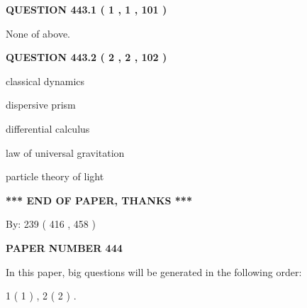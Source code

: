 \documentclass[12pt]{article}
\begin{document}
{\textbf{\Large{QUESTION
443.1 
 ( 1 , 1 , 101 )
}}}
  
  
 
 
\noindent{}
 
 
 None of above.
 
 
 
 
  
\vspace{0.2in}
  
{\textbf{\Large{QUESTION
443.2 
 ( 2 , 2 , 102 )
}}}
  
  
 
 
\noindent{}
 
 
classical dynamics
 
 
dispersive prism
 
 
differential calculus
 
 
law of universal gravitation
 
 
particle theory of light
 
 
 
 
   
   
\vspace{1.0in} 
{\textbf{\large{ *** END OF PAPER, THANKS *** }}} 
   
   
\hspace{1.0in} By: 
 239 ( 416 ,  458 )
   
   
   
   
\newpage 
\setcounter{page}{ 
   444001 } 
   
   
   
   
 {\textbf{ \Large{ PAPER NUMBER  444  }}}
   
   
\vspace{0.2in}
   
   
   
   
   
\vspace{0.2in}
   
In this paper, big questions will be generated in the following order: 
   
   
   1 ( 1 )
 ,
   2 ( 2 )
 .
  
\end{document}
